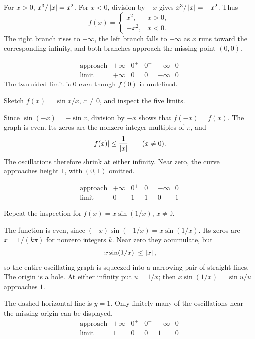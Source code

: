 For $x>0$, $x^3/\left|x\right|=x^2$. For $x<0$, division by $-x$
gives $x^3/\left|x\right|=-x^2$. Thus
\[
 f(x)=\begin{cases}x^2,&x>0,\\-x^2,&x<0.\end{cases}
\]
The right branch rises to $+\infty$, the left branch falls to
$-\infty$ as $x$ runs toward the corresponding infinity, and both
branches approach the missing point $(0,0)$.
\begin{center}\rossSketchSignedSquare\end{center}
\[
\begin{array}{c|ccccc}
 \text{approach}&+\infty&0^+&0^-&-\infty&0\\ \hline
 \text{limit}&+\infty&0&0&-\infty&0
\end{array}
\]
The two-sided limit is $0$ even though $f(0)$ is undefined.

\goal Sketch $f(x)=\sin x/x$, $x\ne0$, and inspect the five limits.

Since $\sin(-x)=-\sin x$, division by $-x$ shows that
$f(-x)=f(x)$. The graph is even. Its zeros are the nonzero
integer multiples of $\pi$, and
\[
 \left|f(x)\right|\le\frac1{\left|x\right|}\qquad(x\ne0).
\]
The oscillations therefore shrink at either infinity. Near zero,
the curve approaches height $1$, with $(0,1)$ omitted.
\begin{center}\rossSketchSinc\end{center}
\[
\begin{array}{c|ccccc}
 \text{approach}&+\infty&0^+&0^-&-\infty&0\\ \hline
 \text{limit}&0&1&1&0&1
\end{array}
\]

\goal Repeat the inspection for $f(x)=x\sin(1/x)$, $x\ne0$.

The function is even, since
$(-x)\sin(-1/x)=x\sin(1/x)$. Its zeros are
$x=1/(k\pi)$ for nonzero integers $k$. Near zero they accumulate,
but
\[
 \left|x\sin(1/x)\right|\le\left|x\right|,
\]
so the entire oscillating graph is squeezed into a narrowing pair
of straight lines. The origin is a hole. At either infinity put
$u=1/x$; then $x\sin(1/x)=\sin u/u$ approaches $1$.
\begin{center}\rossSketchOscillatingProduct\end{center}
The dashed horizontal line is $y=1$. Only finitely many of the
oscillations near the missing origin can be displayed.
\[
\begin{array}{c|ccccc}
 \text{approach}&+\infty&0^+&0^-&-\infty&0\\ \hline
 \text{limit}&1&0&0&1&0
\end{array}
\]

